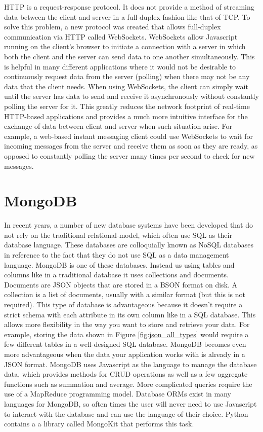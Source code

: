 HTTP is a request-response protocol. It does not provide a method of streaming data between the client and server in a full-duplex fashion like that of TCP. To solve this problem, a new protocol was created that allows full-duplex communication via HTTP called WebSockets. WebSockets allow Javascript running on the client's browser to initiate a connection with a server in which both the client and the server can send data to one another simultaneously\cite{fette2011websocket}. This is helpful in many different applications where it would not be desirable to continuously request data from the server (polling) when there may not be any data that the client needs. When using WebSockets, the client can simply wait until the server has data to send and receive it asynchronously without constantly polling the server for it. This greatly reduces the network footprint of real-time HTTP-based applications and provides a much more intuitive interface for the exchange of data between client and server when such situation arise. For example, a web-based instant messaging client could use WebSockets to wait for incoming messages from the server and receive them as soon as they are ready, as opposed to constantly polling the server many times per second to check for new messages.

\section{MongoDB}

In recent years, a number of new database systems have been developed that do not rely on the traditional relational-model, which often use SQL as their database language. These databases are colloquially known as NoSQL databases in reference to the fact that they do not use SQL as a data management language\cite{lith2010investigating}. MongoDB is one of these databases. Instead us using tables and columns like in a traditional database it uses collections and documents\cite{chodorow2013mongodb}. Documents are JSON objects that are stored in a BSON format on disk. A collection is a list of documents, usually with a similar format (but this is not required). This type of database is advantageous because it doesn't require a strict schema with each attribute in its own column like in a SQL database\cite{chodorow2013mongodb}. This allows more flexibility in the way you want to store and retrieve your data. For example, storing the data shown in Figure \ref{fig:json_all_types} would require a few different tables in a well-designed SQL database. MongoDB becomes even more advantageous when the data your application works with is already in a JSON format. MongoDB uses Javascript as the language to manage the database data, which provides methods for CRUD operations as well as a few aggregate functions such as summation and average. More complicated queries require the use of a MapReduce programming model\cite{chodorow2013mongodb}. Database ORMs exist in many languages for MongoDB, so often times the user will never need to use Javascript to interact with the database and can use the language of their choice. Python contains a a library called MongoKit that performs this task\cite{tsoukalos2014using}.

